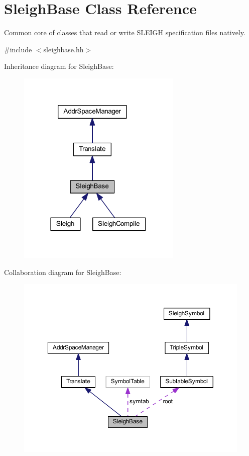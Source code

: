 \hypertarget{class_sleigh_base}{}\section{Sleigh\+Base Class Reference}
\label{class_sleigh_base}


Common core of classes that read or write S\+L\+E\+I\+GH specification files natively.  




{\ttfamily \#include $<$sleighbase.\+hh$>$}



Inheritance diagram for Sleigh\+Base\+:
\nopagebreak
\begin{figure}[H]
\begin{center}
\leavevmode
\includegraphics[width=222pt]{class_sleigh_base__inherit__graph}
\end{center}
\end{figure}


Collaboration diagram for Sleigh\+Base\+:
\nopagebreak
\begin{figure}[H]
\begin{center}
\leavevmode
\includegraphics[width=350pt]{class_sleigh_base__coll__graph}
\end{center}
\end{figure}
